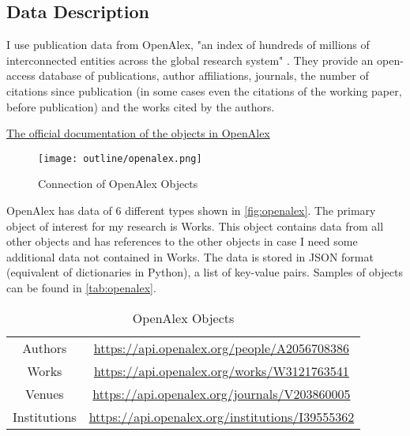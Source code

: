 \documentclass[10pt]{report}
\begin{document}
\subsection*{Data Description}
\label{ssec:data}

I use publication data from OpenAlex, "an index of hundreds of millions of interconnected entities across the global research system" \parencite[]{Priem2022}. They provide an open-access database of publications, author affiliations, journals, the number of citations since publication (in some cases even the citations of the working paper, before publication) and the works cited by the authors.

\centering\hyperlink{https://docs.openalex.org/about-the-data}{The official documentation of the objects in OpenAlex}

\begin{figure}[htbp]
    \centering
    \texttt{[image: outline/openalex.png]}
    \caption{Connection of OpenAlex Objects}
    \label{fig:openalex}
\end{figure}

\justify OpenAlex has data of 6 different types shown in \autoref{fig:openalex}. The primary object of interest for my research is Works. This object contains data from all other objects and has references to the other objects in case I need some additional data not contained in Works.
The data is stored in JSON format (equivalent of dictionaries in Python), a list of key-value pairs.
Samples of objects can be found in \autoref{tab:openalex}.

\vspace{10pt}

\begin{table}[htbp]
    \centering
    \begin{tabular}{c|c}
         Authors & \hyperlink{https://api.openalex.org/people/A2056708386}{https://api.openalex.org/people/A2056708386} \\
         Works &  \hyperlink{https://api.openalex.org/works/W3121763541}{https://api.openalex.org/works/W3121763541} \\
         Venues & \hyperlink{https://api.openalex.org/journals/V203860005}{https://api.openalex.org/journals/V203860005} \\
         Institutions & \hyperlink{https://api.openalex.org/institutions/I39555362}{https://api.openalex.org/institutions/I39555362} \\
         
    \end{tabular}
    \caption{OpenAlex Objects}
    \label{tab:openalex}
\end{table}
\end{document}
